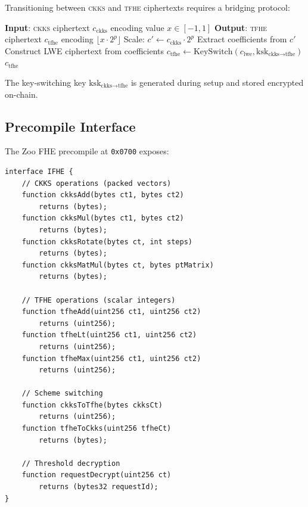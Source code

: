 \documentclass[11pt,letterpaper]{article}
\newcommand{\TFHE}{\textsc{tfhe}}
\newcommand{\CKKS}{\textsc{ckks}}
\begin{document}
Transitioning between \CKKS{} and \TFHE{} ciphertexts requires a bridging protocol:

\begin{algorithm}[t]
\caption{CKKS-to-TFHE Bridge}
\label{alg:bridge}
\begin{algorithmic}[1]
\STATE \textbf{Input}: \CKKS{} ciphertext $c_{\text{ckks}}$ encoding value $x \in [-1, 1]$
\STATE \textbf{Output}: \TFHE{} ciphertext $c_{\text{tfhe}}$ encoding $\lfloor x \cdot 2^p \rfloor$
\STATE Scale: $c' \leftarrow c_{\text{ckks}} \cdot 2^p$
\STATE Extract coefficients from $c'$
\STATE Construct LWE ciphertext from coefficients
\STATE $c_{\text{tfhe}} \leftarrow \text{KeySwitch}(c_{\text{lwe}}, \text{ksk}_{\text{ckks} \to \text{tfhe}})$
\RETURN $c_{\text{tfhe}}$
\end{algorithmic}
\end{algorithm}

The key-switching key $\text{ksk}_{\text{ckks} \to \text{tfhe}}$ is generated during setup and stored encrypted on-chain.

\subsection{Precompile Interface}

The Zoo FHE precompile at \texttt{0x0700} exposes:

\begin{lstlisting}[basicstyle=\ttfamily\small,caption=Zoo FHE Precompile Interface]
interface IFHE {
    // CKKS operations (packed vectors)
    function ckksAdd(bytes ct1, bytes ct2)
        returns (bytes);
    function ckksMul(bytes ct1, bytes ct2)
        returns (bytes);
    function ckksRotate(bytes ct, int steps)
        returns (bytes);
    function ckksMatMul(bytes ct, bytes ptMatrix)
        returns (bytes);

    // TFHE operations (scalar integers)
    function tfheAdd(uint256 ct1, uint256 ct2)
        returns (uint256);
    function tfheLt(uint256 ct1, uint256 ct2)
        returns (uint256);
    function tfheMax(uint256 ct1, uint256 ct2)
        returns (uint256);

    // Scheme switching
    function ckksToTfhe(bytes ckksCt)
        returns (uint256);
    function tfheToCkks(uint256 tfheCt)
        returns (bytes);

    // Threshold decryption
    function requestDecrypt(uint256 ct)
        returns (bytes32 requestId);
}
\end{lstlisting}
\end{document}
